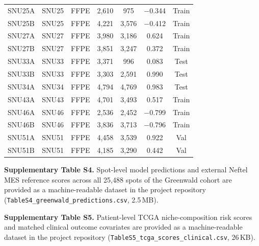 \documentclass[11pt,letterpaper]{article}
\begin{document}
\begin{table}[H]
\begin{tabular}{llccccc}
SNU25A         & SNU25   & FFPE   & 2{,}610 & 975     & $-$0.344 & Train \\
SNU25B         & SNU25   & FFPE   & 4{,}221 & 3{,}576 & $-$0.412 & Train \\
SNU27A         & SNU27   & FFPE   & 3{,}980 & 3{,}186 & 0.624  & Train \\
SNU27B         & SNU27   & FFPE   & 3{,}851 & 3{,}247 & 0.372  & Train \\
SNU33A         & SNU33   & FFPE   & 3{,}371 & 996     & 0.083  & Test \\
SNU33B         & SNU33   & FFPE   & 3{,}303 & 2{,}591 & 0.990  & Test \\
SNU34A         & SNU34   & FFPE   & 4{,}794 & 4{,}769 & 0.983  & Test \\
SNU43A         & SNU43   & FFPE   & 4{,}701 & 3{,}493 & 0.517  & Train \\
SNU46A         & SNU46   & FFPE   & 2{,}536 & 2{,}452 & $-$0.799 & Train \\
SNU46B         & SNU46   & FFPE   & 3{,}836 & 3{,}713 & $-$0.796 & Train \\
SNU51A         & SNU51   & FFPE   & 4{,}458 & 3{,}539 & 0.922  & Val \\
SNU51B         & SNU51   & FFPE   & 4{,}185 & 3{,}290 & 0.442  & Val \\
\bottomrule
\end{tabular}
\end{table}

\vspace{1em}
\noindent\textbf{Supplementary Table S4.} Spot-level model predictions and external Neftel MES reference scores across all 25{,}488 spots of the Greenwald cohort are provided as a machine-readable dataset in the project repository (\texttt{TableS4\_}\allowbreak\texttt{greenwald\_}\allowbreak\texttt{predictions.csv}, 2.5\,MB).

\vspace{0.5em}
\noindent\textbf{Supplementary Table S5.} Patient-level TCGA niche-composition risk scores and matched clinical outcome covariates are provided as a machine-readable dataset in the project repository (\texttt{TableS5\_}\allowbreak\texttt{tcga\_}\allowbreak\texttt{scores\_}\allowbreak\texttt{clinical.csv}, 26\,KB).

\clearpage
\end{document}
